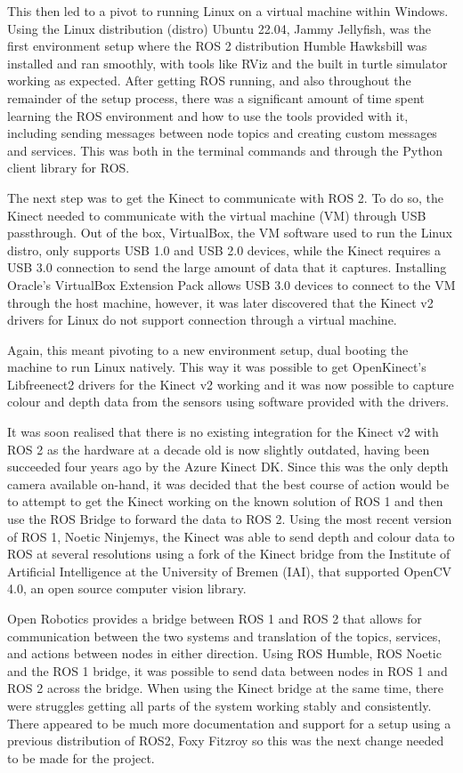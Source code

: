 This then led to a pivot to running Linux on a virtual machine within Windows.
Using the Linux distribution (distro) Ubuntu 22.04, Jammy Jellyfish, was the first environment setup where the ROS 2 distribution Humble Hawksbill was installed and ran smoothly, with tools like RViz and the built in turtle simulator working as expected.
After getting ROS running, and also throughout the remainder of the setup process, there was a significant amount of time spent learning the ROS environment and how to use the tools provided with it, including sending messages between node topics and creating custom messages and services.
This was both in the terminal commands and through the Python client library for ROS.

The next step was to get the Kinect to communicate with ROS 2.
To do so, the Kinect needed to communicate with the virtual machine (VM) through USB passthrough.
Out of the box, VirtualBox, the VM software used to run the Linux distro, only supports USB 1.0 and USB 2.0 devices, while the Kinect requires a USB 3.0 connection to send the large amount of data that it captures.
Installing Oracle's VirtualBox Extension Pack allows USB 3.0 devices to connect to the VM through the host machine, however, it was later discovered that the Kinect v2 drivers for Linux do not support connection through a virtual machine.

Again, this meant pivoting to a new environment setup, dual booting the machine to run Linux natively.
This way it was possible to get OpenKinect's Libfreenect2 drivers for the Kinect v2 working and it was now possible to capture colour and depth data from the sensors using software provided with the drivers.

It was soon realised that there is no existing integration for the Kinect v2 with ROS 2 as the hardware at a decade old is now slightly outdated, having been succeeded four years ago by the Azure Kinect DK.
Since this was the only depth camera available on-hand, it was decided that the best course of action would be to attempt to get the Kinect working on the known solution of ROS 1 and then use the ROS Bridge to forward the data to ROS 2.
Using the most recent version of ROS 1, Noetic Ninjemys, the Kinect was able to send depth and colour data to ROS at several resolutions using a fork of the Kinect bridge from the Institute of Artificial Intelligence at the University of Bremen (IAI), that supported OpenCV 4.0, an open source computer vision library.

Open Robotics provides a bridge between ROS 1 and ROS 2 that allows for communication between the two systems and translation of the topics, services, and actions between nodes in either direction.
Using ROS Humble, ROS Noetic and the ROS 1 bridge, it was possible to send data between nodes in ROS 1 and ROS 2 across the bridge.
When using the Kinect bridge at the same time, there were struggles getting all parts of the system working stably and consistently.
There appeared to be much more documentation and support for a setup using a previous distribution of ROS2, Foxy Fitzroy so this was the next change needed to be made for the project.

